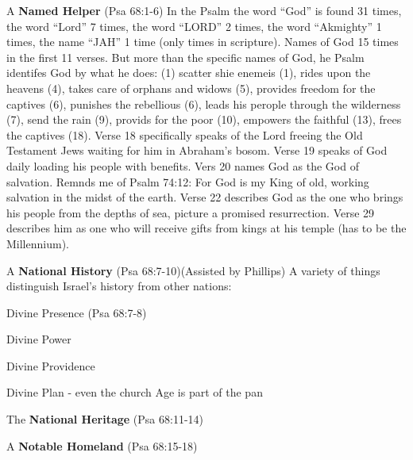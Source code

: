 \begin{compactenum}[I.]
	\item A \textbf{Named Helper} (Psa 68:1-6) In the Psalm the word ``God'' is found 31 times, the word ``Lord'' 7 times, the word ``LORD'' 2 times, the word ``Akmighty'' 1 times, the name ``JAH'' 1 time (only times in scripture). Names of God 15 times in the first 11 verses. But more than the specific names of God, he Psalm identifes God by what he does: (1) scatter shie enemeis (1), rides upon the heavens (4), takes care of orphans and widows (5), provides freedom for the captives  (6), punishes the rebellious (6), leads his perople through the wilderness (7), send the rain (9), provids for the poor (10), empowers the faithful (13), frees the captives (18). Verse 18 specifically speaks of the Lord freeing the Old Testament Jews waiting for him in Abraham's bosom. 	Verse 19 speaks of God daily loading his people with benefits. Vers 20 names God as the God of salvation. Remnds me of Psalm 74:12: For God is my King of old, working salvation in the midst of the earth. Verse 22 describes God as the one who brings his people from the depths of sea, picture a promised resurrection. Verse 29 describes him as one who will receive gifts from kings at his temple (has to be the Millennium).
	\item A \textbf{National History} (Psa 68:7-10)(Assisted by Phillips) A variety of things distinguish Israel's history from other nations: 
	\begin{compactenum}[A.]
	\item Divine Presence (Psa 68:7-8)
	\item Divine Power
	\item Divine Providence
	\item Divine Plan - even the  church Age is part of the pan
	\end{compactenum}
	\item The \textbf{National Heritage} (Psa 68:11-14)
	\item A \textbf{Notable Homeland} (Psa 68:15-18)
\end{compactenum}

